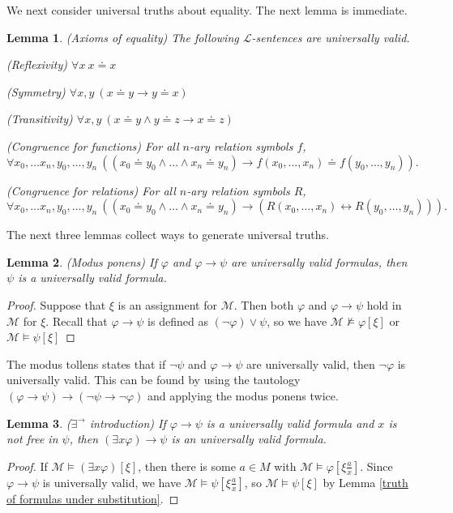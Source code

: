 \documentclass[a4paper, 11pt]{amsart}
\newtheorem{lemma}[lemma]{Lemma}
\theoremstyle{remark}
\newcommand{\cL}{\mathcal L}
\newcommand{\cM}{\mathcal M}
\newenvironment{enumerate-(1)}{\begin{enumerate}[label={\upshape (\arabic*)}, leftmargin=2pc]}{\end{enumerate}}
\begin{document}
We next consider universal truths about equality. 
The next lemma is immediate. 

\begin{lemma}(Axioms of equality) 
The following $\cL$-sentences are universally valid. 
\begin{enumerate-(1)} 
\item 
(Reflexivity) 
$\forall x\ x\doteq x$ 
\item 
(Symmetry) 
$\forall x,y\ (x\doteq y \rightarrow y\doteq x) $ 
\item 
(Transitivity) 
$\forall x,y\ (x\doteq y\wedge y\doteq z \rightarrow x\doteq z)$ 
\item 
(Congruence for functions) 
For all $n$-ary relation symbols $f$, 
$$\forall x_0,\dots x_n, y_0,\dots,y_n\ ((x_0\doteq y_0\wedge \dots \wedge x_n\doteq y_n) \rightarrow f(x_0,\dots,x_n) \doteq f(y_0,\dots,y_n)).$$ 
\item 
(Congruence for relations) 
For all $n$-ary relation symbols $R$, 
$$\forall x_0,\dots x_n, y_0,\dots,y_n\ ((x_0\doteq y_0\wedge \dots \wedge x_n\doteq y_n) \rightarrow (R(x_0,\dots,x_n) \leftrightarrow R(y_0,\dots,y_n))).$$ 
\end{enumerate-(1)} 
\end{lemma}

The next three lemmas collect ways to generate universal truths. 



\begin{lemma}(Modus ponens) 
If $\varphi$ and $\varphi\rightarrow \psi$ are universally valid formulas, then $\psi$ is a universally valid formula. 
\end{lemma} 
\begin{proof} 
Suppose that $\xi$ is an assignment for $\cM$. Then both $\varphi$ and $\varphi\rightarrow \psi$ hold in $\cM$ for $\xi$. 
Recall that $\varphi\rightarrow \psi$ is defined as $(\neg \varphi) \vee \psi$, so we have $\cM \not\models \varphi [\xi]$ or  $\cM \models \psi [\xi]$ 
\end{proof} 

The modus tollens states that if $\neg\psi$ and $\varphi\rightarrow \psi$ are universally valid, then $\neg\varphi$ is universally valid. 
This can be found by using the tautology $(\varphi\rightarrow \psi) \longrightarrow (\neg\psi\rightarrow \neg\varphi)$ and applying the modus ponens twice. 


\begin{lemma}
($\exists^\rightarrow$ introduction) 
If $\varphi\rightarrow \psi$ is a universally valid formula and $x$ is not free in $\psi$, then $(\exists x \varphi) \rightarrow \psi$ is an universally valid formula. 
\end{lemma} 
\begin{proof} 
If $\cM \models (\exists x \varphi)[\xi]$, then there is some $a\in M$ with $\cM\models \varphi[\xi\frac{a}{x}]$. 
Since $\varphi\rightarrow \psi$ is universally valid, we have $\cM\models \psi[\xi\frac{a}{x}]$, so $\cM\models \psi[\xi]$ by Lemma \ref{truth of formulas under substitution}. 
\end{proof} 
\end{document}
